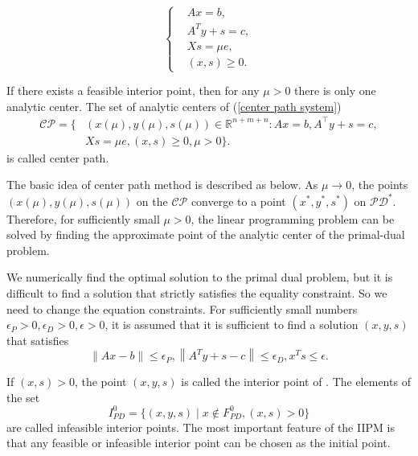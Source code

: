 \begin{equation}\label{center path system}
    \left\{
    \begin{aligned}
        & A x=b, \\
        & A^T y+s=c, \\
        & X s=\mu e ,\\
        & (x,s) \geq 0.
    \end{aligned}
    \right.
\end{equation}

If there exists a feasible interior point, then for any $\mu > 0$ there is only one analytic center. The set of analytic centers of (\ref{center path system})
\begin{align*}
    \mathcal{CP} = \{ &(x(\mu), y(\mu), s(\mu)) \in \mathbb{R}^{n+m+n}: A x = b, A^{\top} y + s = c, \\
    &X s=\mu e, (x,s) \geq 0, \mu > 0\}.
\end{align*}
is called \alert{center path}.

The basic idea of center path method is described as below. As $\mu \rightarrow 0$, the points $(x(\mu), y(\mu), s(\mu))$ on the $\mathcal{CP}$ converge to a point $(x^*, y^*, s^*)$ on $\mathcal{PD^*}$. Therefore, for sufficiently small $\mu > 0$, the linear programming problem can be solved by finding the \alert{approximate point} of the analytic center of the primal-dual problem.

We numerically find the optimal solution to the primal dual problem, but it is difficult to find a solution that strictly satisfies the equality constraint. So we need to change the equation constraints. For sufficiently small numbers $\epsilon_P>0, \epsilon_D>0, \epsilon>0$, it is assumed that it is sufficient to find a solution $(x,y,s)$ that satisfies 
$$
\| A  x- b\| \leq \epsilon_P,\left\| A^T  y+ s- c\right\| \leq \epsilon_D,  x^T  s \leq \epsilon.
$$


If $(x,s)>0$, the point $(x,y,s)$ is called the interior point of . The elements of the set
$$
I_{PD}^0 = \{(x,y,s) \mid x\notin F_{PD}^{0}, (x,s)>0\}
$$
are called infeasible interior points. The most important feature of the IIPM is that any feasible or infeasible interior point can be chosen as the initial point.

